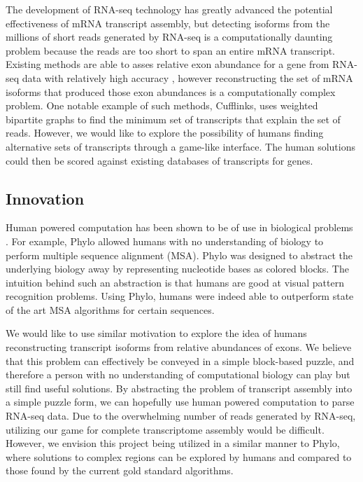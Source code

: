 \documentclass[12pt]{article}
\begin{document}
The development of RNA-seq technology has greatly advanced the potential effectiveness of mRNA transcript assembly, but detecting isoforms from the millions of short reads generated by RNA-seq is a computationally daunting problem because the reads are too short to span an entire mRNA transcript. Existing methods are able to asses relative exon abundance for a gene from RNA-seq data with relatively high accuracy \citep{trapnell2009tophat}, however reconstructing the set of mRNA isoforms that produced those exon abundances is a computationally complex problem. One notable example of such methods, Cufflinks, uses weighted bipartite graphs to find the minimum set of transcripts that explain the set of reads. However, we would like to explore the possibility of humans finding alternative sets of transcripts through a game-like interface. The human solutions could then be scored against existing databases of transcripts for genes.

\subsection*{Innovation}
Human powered computation has been shown to be of use in biological problems \citep{kawrykow2012phylo, cooper2010predicting}. For example, Phylo allowed humans with no understanding of biology to perform multiple sequence alignment (MSA). Phylo was designed to abstract the underlying biology away by representing nucleotide bases as colored blocks.  The intuition behind such an abstraction is that humans are good at visual pattern recognition problems. Using Phylo, humans were indeed able to outperform state of the art MSA algorithms for certain sequences. 

We would like to use similar motivation to explore the idea of humans reconstructing transcript isoforms from relative abundances of exons. We believe that this problem can effectively be conveyed in a simple block-based puzzle, and therefore a person with no understanding of computational biology can play but still find useful solutions. By abstracting the problem of transcript assembly into a simple puzzle form, we can hopefully use human powered computation to parse RNA-seq data. Due to the overwhelming number of reads generated by RNA-seq, utilizing our game for complete transcriptome assembly would be difficult. However, we envision this project being utilized in a similar manner to Phylo, where solutions to complex regions can be explored by humans and compared to those found by the current gold standard algorithms.
\end{document}
